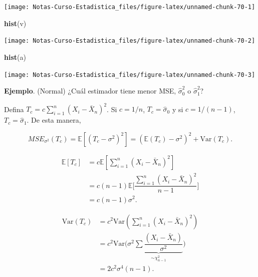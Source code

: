 \documentclass[
  12pt,
]{book}
\newenvironment{Shaded}{\begin{snugshade}}{\end{snugshade}}
\newcommand{\KeywordTok}[1]{\textcolor[rgb]{0.13,0.29,0.53}{\textbf{#1}}}
\newcommand{\NormalTok}[1]{#1}
\begin{document}
\begin{center}\texttt{[image: Notas-Curso-Estadistica\_files/figure-latex/unnamed-chunk-70-1]} \end{center}

\begin{Shaded}
\begin{Highlighting}[]
\KeywordTok{hist}\NormalTok{(v)}
\end{Highlighting}
\end{Shaded}

\begin{center}\texttt{[image: Notas-Curso-Estadistica\_files/figure-latex/unnamed-chunk-70-2]} \end{center}

\begin{Shaded}
\begin{Highlighting}[]
\KeywordTok{hist}\NormalTok{(a)}
\end{Highlighting}
\end{Shaded}

\begin{center}\texttt{[image: Notas-Curso-Estadistica\_files/figure-latex/unnamed-chunk-70-3]} \end{center}

\textbf{Ejemplo}. (Normal) ¿Cuál estimador tiene menor MSE, \(\hat\sigma^2_0\) o \(\hat\sigma^2_1\)?

Defina \(T_c = c\sum_{i=1}^{n}\left(X_{i}-\bar{X}_{n}\right)^{2}\). Si \(c = 1/n\), \(T_c = \hat\sigma_0\) y si \(c = 1/(n-1)\), \(T_c = \hat\sigma_1\). De esta manera,

\[MSE_{\sigma^2}(T_c) = \mathbb E[(T_c-\sigma^2)^2] =(\mathbb E(T_c)-\sigma^2)^2+\text{Var}(T_c).\]

\begin{align*}
  \mathbb E[T_c]
  &= c\mathbb E[\sum_{i=1}^{n}\left(X_{i}-\bar{X}_{n}\right)^{2}] \\
  &= c(n-1)\mathbb E\bigg[\dfrac{\sum_{i=1}^{n}\left(X_{i}-\bar{X}_{n}\right)^{2}}{n-1}\bigg] \\
  &= c(n-1)\sigma^2.
\end{align*}

\begin{align*}
  \text{Var}(T_c)
  &= c^2\text{Var}(\sum_{i=1}^{n}\left(X_{i}-\bar{X}_{n}\right)^{2}) \\
  &= c^2\text{Var}\Bigg(\sigma^2\underbrace{\sum\dfrac{(X_i-\bar X_n)}{\sigma^2}}_{\sim\chi^2_{n-1}}\Bigg) \\
  &= 2c^2\sigma^4(n-1).
\end{align*}
\end{document}
